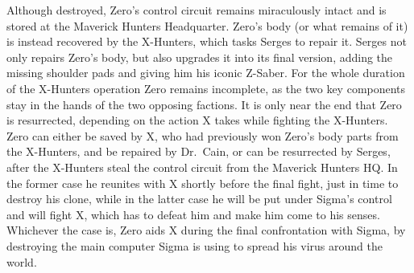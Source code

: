Although destroyed, Zero's control circuit remains miraculously intact and is stored at the Maverick Hunters Headquarter. Zero's body (or what remains of it) is instead recovered by the X-Hunters, which tasks Serges to repair it. Serges not only repairs Zero's body, but also upgrades it into its final version, adding the missing shoulder pads and giving him his iconic Z-Saber. For the whole duration of the X-Hunters operation Zero remains incomplete, as the two key components stay in the hands of the two opposing factions. It is only near the end that Zero is resurrected, depending on the action X takes while fighting the X-Hunters. Zero can either be saved by X, who had previously won Zero's body parts from the X-Hunters, and be repaired by Dr.~Cain, or can be resurrected by Serges, after the X-Hunters steal the control circuit from the Maverick Hunters HQ. In the former case he reunites with X shortly before the final fight, just in time to destroy his clone, while in the latter case he will be put under Sigma's control and will fight X, which has to defeat him and make him come to his senses. Whichever the case is, Zero aids X during the final confrontation with Sigma, by destroying the main computer Sigma is using to spread his virus around the world.
